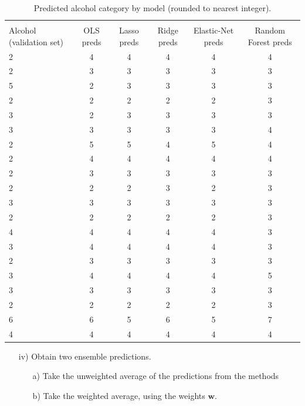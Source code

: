 \documentclass[12pt,letterpaper]{article}
\begin{document}
  

\begin{table}[H] \centering 
  \caption{\footnotesize{Predicted alcohol category by model (rounded to nearest integer).} }
  \label{} 
\begin{tabular}{@{\extracolsep{5pt}}lccccc} 
\\[-1.8ex]\hline 
\hline \\[-1.8ex] 
  \footnotesize{Alcohol (validation set)} & \footnotesize{OLS preds} & \footnotesize{Lasso preds} & \footnotesize{Ridge preds} & \footnotesize{Elastic-Net preds} & \footnotesize{Random Forest preds} \\ 
  \hline
 2 & 4 & 4 & 4 & 4 & 4 \\ 
   2 & 3 & 3 & 3 & 3 & 3 \\ 
   5 & 2 & 3 & 3 & 3 & 3 \\ 
   2 & 2 & 2 & 2 & 2 & 3 \\ 
   3 & 2 & 3 & 3 & 3 & 3 \\ 
   3 & 3 & 3 & 3 & 3 & 4 \\ 
   2 & 5 & 5 & 4 & 5 & 4 \\ 
   2 & 4 & 4 & 4 & 4 & 4 \\ 
   2 & 3 & 3 & 3 & 3 & 3 \\ 
   2 & 2 & 2 & 3 & 2 & 3 \\ 
   3 & 3 & 3 & 3 & 3 & 3 \\ 
   2 & 2 & 2 & 2 & 2 & 3 \\ 
   4 & 4 & 4 & 4 & 4 & 3 \\ 
   3 & 4 & 4 & 4 & 4 & 3 \\ 
   2 & 3 & 3 & 3 & 3 & 3 \\ 
   3 & 4 & 4 & 4 & 4 & 5 \\ 
   3 & 3 & 3 & 3 & 3 & 3 \\ 
   2 & 2 & 2 & 2 & 2 & 3 \\ 
   6 & 6 & 5 & 6 & 5 & 7 \\ 
   4 & 4 & 4 & 4 & 4 & 4 \\ 
   \hline
\end{tabular}
\end{table}

\begin{itemize}
\item[iv)]   Obtain two ensemble predictions.
\begin{itemize}
\item[a)] Take the unweighted average of the predictions from the methods
\item[b)] Take the weighted average, using the weights $\boldsymbol{w}$.
\end{itemize}
\end{itemize}
\end{document}
